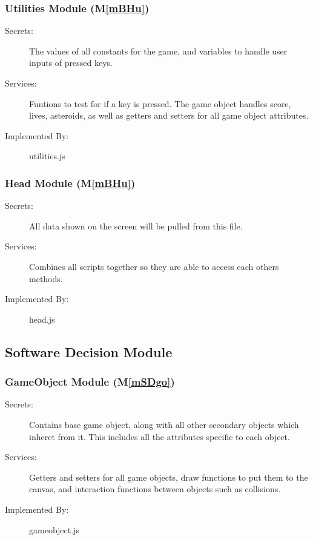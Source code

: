 \documentclass[12pt, titlepage]{article}
\newcommand{\mref}[1]{M\ref{#1}}
\begin{document}
\subsubsection{Utilities Module (\mref{mBHu})}
\begin{description}
\item[Secrets:]The values of all constants for the game, and variables to handle user inputs of pressed keys.
\item[Services:] Funtions to test for if a key is pressed. The game object handles score, lives, asteroids, as well as getters and setters for all game object attributes.
\item[Implemented By:] utilities.js
\end{description}

\subsubsection{Head Module (\mref{mBHu})}
\begin{description}
\item[Secrets:]All data shown on the screen will be pulled from this file.
\item[Services:] Combines all scripts together so they are able to access each others methods.
\item[Implemented By:] head.js
\end{description}


\subsection{Software Decision Module}


\subsubsection{GameObject Module (\mref{mSDgo})}
\begin{description}
\item[Secrets:] Contains base game object, along with all other secondary objects which inheret from it. This includes all the attributes specific to each object.
\item[Services:] Getters and setters for all game objects, draw functions to put them to the canvas, and interaction functions between objects such as collisions.
\item[Implemented By:] gameobject.js
\end{description}
\end{document}
